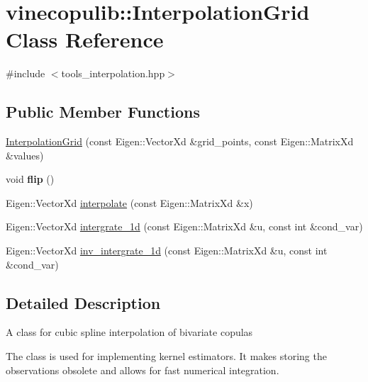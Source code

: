 \hypertarget{classvinecopulib_1_1_interpolation_grid}{}\section{vinecopulib\+:\+:Interpolation\+Grid Class Reference}
\label{classvinecopulib_1_1_interpolation_grid}


{\ttfamily \#include $<$tools\+\_\+interpolation.\+hpp$>$}

\subsection*{Public Member Functions}
\begin{DoxyCompactItemize}
\item 
\hyperlink{classvinecopulib_1_1_interpolation_grid_a9e63e4af3a252454eeae6df38fd8e0ca}{Interpolation\+Grid} (const Eigen\+::\+Vector\+Xd \&grid\+\_\+points, const Eigen\+::\+Matrix\+Xd \&values)
\item 
void {\bfseries flip} ()\hypertarget{classvinecopulib_1_1_interpolation_grid_a8dc18717a2e8dfe5b157571805a25dab}{}\label{classvinecopulib_1_1_interpolation_grid_a8dc18717a2e8dfe5b157571805a25dab}

\item 
Eigen\+::\+Vector\+Xd \hyperlink{classvinecopulib_1_1_interpolation_grid_a7fe207d7f864d2b05654c5efb5e27f35}{interpolate} (const Eigen\+::\+Matrix\+Xd \&x)
\item 
Eigen\+::\+Vector\+Xd \hyperlink{classvinecopulib_1_1_interpolation_grid_aa1811201ba71d8c3375b8e42df6f673a}{intergrate\+\_\+1d} (const Eigen\+::\+Matrix\+Xd \&u, const int \&cond\+\_\+var)
\item 
Eigen\+::\+Vector\+Xd \hyperlink{classvinecopulib_1_1_interpolation_grid_a087c7e9b9c6087b6cbbb8ba7b7292582}{inv\+\_\+intergrate\+\_\+1d} (const Eigen\+::\+Matrix\+Xd \&u, const int \&cond\+\_\+var)
\end{DoxyCompactItemize}


\subsection{Detailed Description}
A class for cubic spline interpolation of bivariate copulas

The class is used for implementing kernel estimators. It makes storing the observations obsolete and allows for fast numerical integration. 

